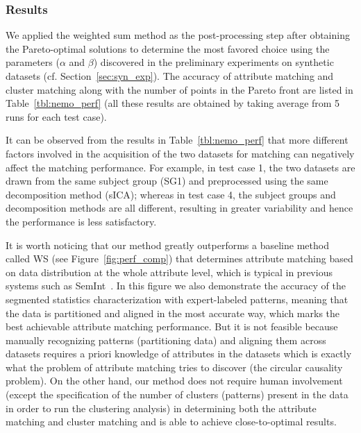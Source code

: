 \subsubsection{Results}
We applied the weighted sum method as the post-processing step after obtaining the Pareto-optimal solutions to determine the most favored choice using the parameters ($\alpha$ and $\beta$) discovered in the preliminary experiments on synthetic datasets (cf. Section~\ref{sec:syn_exp}). The accuracy of attribute matching and cluster matching along with the number of points in the Pareto front are listed in Table~\ref{tbl:nemo_perf} (all these results are obtained by taking average from 5 runs for each test case).


It can be observed from the results in Table~\ref{tbl:nemo_perf} that more different factors involved in the acquisition of the two datasets for matching can negatively affect the matching performance. For example, in test case 1, the two datasets are drawn from the same subject group (SG1) and preprocessed using the same decomposition method (sICA); whereas in test case 4, the subject groups and decomposition methods are all different, resulting in greater variability and hence the performance is less satisfactory.

It is worth noticing that our method greatly outperforms a baseline method called WS (see Figure~\ref{fig:perf_comp}) that determines attribute matching based on data distribution at the whole attribute level, which is typical in previous systems such as SemInt~\cite{Li00semint:a}. In this figure we also demonstrate the accuracy of the segmented statistics characterization with expert-labeled patterns, meaning that the data is partitioned and aligned in the most accurate way, which marks the best achievable attribute matching performance. But it is not feasible because manually recognizing patterns (partitioning data) and aligning them across datasets requires a priori knowledge of attributes in the datasets which is exactly what the problem of attribute matching tries to discover (the circular causality problem). On the other hand, our method does not require human involvement (except the specification of the number of clusters (patterns) present in the data in order to run the clustering analysis) in determining both the attribute matching and cluster matching and is able to achieve close-to-optimal results.

